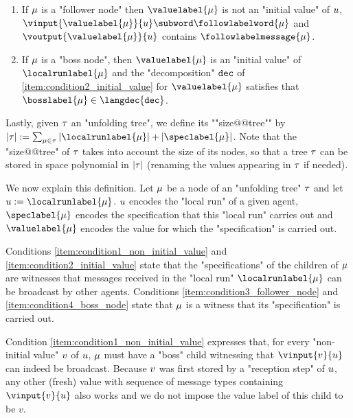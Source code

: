 \begin{definition}
\begin{enumerate}[label= (\roman*), ref=(\roman*)]
	\item \label{item:condition3_follower_node} If $\mu$ is a "follower node" then $\valuelabel{\node}$ is not an "initial value" of $u$, $\vinput{\valuelabel{\node}}{\localrun} \subword \followlabelword{\node}$ and 
	$\voutput{\valuelabel{\node}}{\localrun}$ contains $\followlabelmessage{\node}$.

	\item \label{item:condition4_boss_node} If $\mu$ is a "boss node", then $\valuelabel{\node}$ is an "initial value" of $\localrunlabel{\node}$ and the "decomposition" $\mathtt{dec}$ of \ref{item:condition2_initial_value} for $\valuelabel{\node}$ satisfies that $\bosslabel{\node} \in \langdec{\decsymb}$.
\end{enumerate}

\AP Lastly, given $\tau$ an "unfolding tree", we define its ""size@@tree"" by $\size{\tree} := \sum_{\node \in \tree} \size{\localrunlabel{\node}} + \size{\speclabel{\node}}$. Note that the "size@@tree" of $\tau$ takes into account the size of its nodes, so that a tree $\tau$ can be stored in space polynomial in $|\tau|$ (renaming the values appearing in $\tau$ if needed). 
\end{definition}

We now explain this definition. Let $\mu$ be a node of an "unfolding tree" $\tau$ and let $\localrun := \localrunlabel{\node}$. $u$ encodes the "local run" of a given agent, $\speclabel{\node}$ encodes the specification that this "local run" carries out and $\valuelabel{\node}$ encodes the value for which the "specification" is carried out.

Conditions \ref{item:condition1_non_initial_value} and \ref{item:condition2_initial_value} state that the "specifications" of the children of $\mu$ are witnesses that messages received in the "local run" $\localrunlabel{\node}$ can be broadcast by other agents. Conditions \ref{item:condition3_follower_node} and \ref{item:condition4_boss_node} state that $\mu$ is a witness that its "specification" is carried out. 

Condition \ref{item:condition1_non_initial_value} expresses that, for every "non-initial value" $v$ of $u$, $\mu$ must have a "boss" child witnessing that $\vinput{v}{\localrun}$ can indeed be broadcast. Because $v$ was first stored by a "reception step" of $u$, any other (fresh) value with sequence of message types containing $\vinput{v}{\localrun}$ also works and we do not impose the value label of this child to be $v$. 

